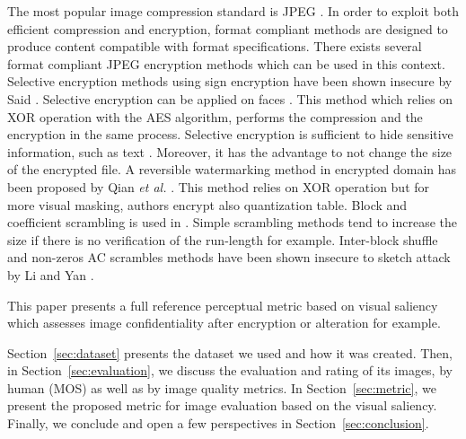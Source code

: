 \documentclass{article}
\begin{document}
The most popular image compression standard is JPEG \cite{wallace1992jpeg}. In order to exploit both efficient compression and encryption, format compliant methods are designed to produce content compatible with format specifications. There exists several format compliant JPEG encryption methods which can be used in this context. Selective encryption methods using sign encryption have been shown insecure by Said \cite{said2005measuring}. Selective encryption can be applied on faces \cite{rodrigues2006selective}. This method which relies on XOR operation with the AES algorithm, performs the compression and the encryption in the same process. Selective encryption is sufficient to hide sensitive information, such as text \cite{pinto2013protection}. Moreover, it has the advantage to not change the size of the encrypted file. A reversible watermarking method in encrypted domain has been proposed by Qian \textit{et al.} \cite{qian2014reversible}. This method relies on XOR operation but for more visual masking, authors encrypt also quantization table. Block and coefficient scrambling is used in \cite{niu2008jpeg, unterweger2012length, minemura2012jpeg, ong2015beyond}. Simple scrambling methods tend to increase the size if there is no verification of the run-length for example. Inter-block shuffle and non-zeros AC scrambles methods have been shown insecure to sketch attack by Li and Yan \cite{li2007leak}.

This paper presents a full reference perceptual metric based on visual saliency which assesses image confidentiality after encryption or alteration for example.

Section~\ref{sec:dataset} presents the dataset we used and how it was created. Then, in Section~\ref{sec:evaluation}, we discuss the evaluation and rating of its images, by human (MOS) as well as by image quality metrics. In Section~\ref{sec:metric}, we present the proposed metric for image evaluation based on the visual saliency. Finally, we conclude and open a few perspectives in Section~\ref{sec:conclusion}.
\end{document}

